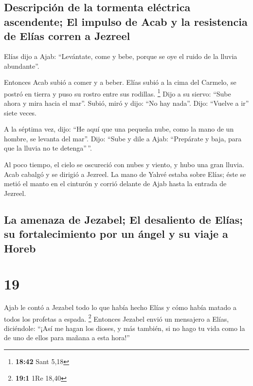 \hypertarget{descripciuxf3n-de-la-tormenta-eluxe9ctrica-ascendente-el-impulso-de-acab-y-la-resistencia-de-eluxedas-corren-a-jezreel}{%
\subsection{Descripción de la tormenta eléctrica ascendente; El impulso
de Acab y la resistencia de Elías corren a
Jezreel}\label{descripciuxf3n-de-la-tormenta-eluxe9ctrica-ascendente-el-impulso-de-acab-y-la-resistencia-de-eluxedas-corren-a-jezreel}}

 Elías dijo a Ajab: ``Levántate, come y bebe, porque se
oye el ruido de la lluvia abundante''.

 Entonces Acab subió a comer y a beber. Elías subió a la
cima del Carmelo, se postró en tierra y puso su rostro entre sus
rodillas. \footnote{\textbf{18:42} Sant 5,18}  Dijo a su
siervo: ``Sube ahora y mira hacia el mar''. Subió, miró y dijo: ``No hay
nada''. Dijo: ``Vuelve a ir'' siete veces.

 A la séptima vez, dijo: ``He aquí que una pequeña nube,
como la mano de un hombre, se levanta del mar''. Dijo: ``Sube y dile a
Ajab: ``Prepárate y baja, para que la lluvia no te detenga''\,''.

 Al poco tiempo, el cielo se oscureció con nubes y
viento, y hubo una gran lluvia. Acab cabalgó y se dirigió a Jezreel.
 La mano de Yahvé estaba sobre Elías; éste se metió el
manto en el cinturón y corrió delante de Ajab hasta la entrada de
Jezreel.

\hypertarget{la-amenaza-de-jezabel-el-desaliento-de-eluxedas-su-fortalecimiento-por-un-uxe1ngel-y-su-viaje-a-horeb}{%
\subsection{La amenaza de Jezabel; El desaliento de Elías; su
fortalecimiento por un ángel y su viaje a
Horeb}\label{la-amenaza-de-jezabel-el-desaliento-de-eluxedas-su-fortalecimiento-por-un-uxe1ngel-y-su-viaje-a-horeb}}

\hypertarget{section-18}{%
\section{19}\label{section-18}}

 Ajab le contó a Jezabel todo lo que había hecho Elías y
cómo había matado a todos los profetas a espada. \footnote{\textbf{19:1}
  1Re 18,40}  Entonces Jezabel envió un mensajero a Elías,
diciéndole: ``¡Así me hagan los dioses, y más también, si no hago tu
vida como la de uno de ellos para mañana a esta hora!''

